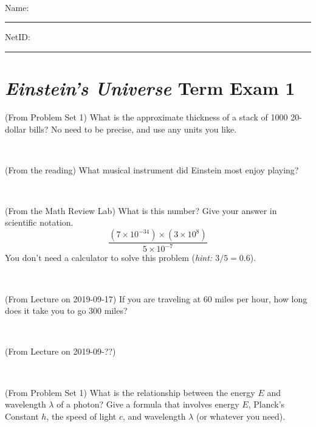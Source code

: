\documentclass[12pt, letterpaper]{article}
\begin{document}
\vfill ~


\cleardoublepage



\noindent
Name: \rule[-1ex]{0.60\textwidth}{0.1pt}
NetID: \rule[-1ex]{0.20\textwidth}{0.1pt}

\section*{\textsl{Einstein's Universe} Term Exam 1}
\setcounter{problem}{1}


\begin{problem} (From Problem Set 1)
What is the approximate thickness of a stack of 1000 20-dollar bills?
No need to be precise, and use any units you like.
\end{problem}


\vfill ~

\begin{problem} (From the reading)
What musical instrument did Einstein most enjoy playing?
\end{problem}


\vfill ~

\begin{problem} (From the Math Review Lab)
What is this number? Give your answer in scientific notation.
$$
\frac{(7\times10^{-34})\times(3\times10^8)}{5\times10^{-7}}
$$
You don't need a calculator to solve this problem (\textit{hint: $3/5=0.6$}).
\end{problem}


\vfill ~

\begin{problem} (From Lecture on 2019-09-17)
If you are traveling at 60 miles per hour, how long does
it take you to go 300 miles?
\end{problem}


\vfill ~


\clearpage


\begin{problem} (From Lecture on 2019-09-??)
\end{problem}


\vfill ~

\begin{problem} (From Problem Set 1)
What is the relationship between the energy $E$ and wavelength
$\lambda$ of a photon? Give a formula that involves energy $E$,
Planck's Constant $h$, the speed of light $c$, and wavelength
$\lambda$ (or whatever you need).
\end{problem}
\end{document}
